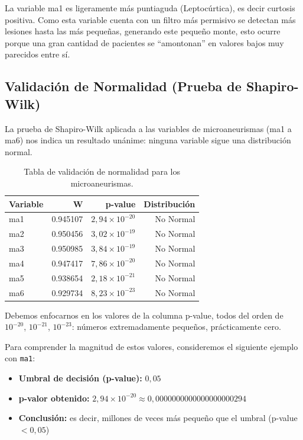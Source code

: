 La variable ma1 es ligeramente más puntiaguda (Leptocúrtica), es decir curtosis positiva. Como esta variable cuenta con un filtro más permisivo se detectan más lesiones hasta las más pequeñas, generando este pequeño monte, esto ocurre porque una gran cantidad de pacientes se \enquote{amontonan} en valores bajos muy parecidos entre sí.

\subsection{Validación de Normalidad (Prueba de Shapiro-Wilk)}

La prueba de Shapiro-Wilk aplicada a las variables de microaneurismas (ma1 a ma6) nos indica un resultado unánime: ninguna variable sigue una distribución normal.


\begin{table}[htbp]
\centering
\caption{Tabla de validación de normalidad para los microaneurismas.}
\begin{tabular}{lrrr}
\toprule
Variable & W & p-value & Distribución \\
\midrule
ma1 & 0.945107 & $2{,}94 \times 10^{-20}$ & No Normal \\
ma2 & 0.950456 & $3{,}02 \times 10^{-19}$ & No Normal \\
ma3 & 0.950985 & $3{,}84 \times 10^{-19}$ & No Normal \\
ma4 & 0.947417 & $7{,}86 \times 10^{-20}$ & No Normal \\
ma5 & 0.938654 & $2{,}18 \times 10^{-21}$ & No Normal \\
ma6 & 0.929734 & $8{,}23 \times 10^{-23}$ & No Normal \\
\bottomrule
\end{tabular}
\end{table}


Debemos enfocarnos en los valores de la columna p-value, todos del orden de $10^{-20}$, $10^{-21}$, $10^{-23}$: números extremadamente pequeños, prácticamente cero.

Para comprender la magnitud de estos valores, consideremos el siguiente ejemplo con \texttt{ma1}:

\begin{itemize}
    \item \textbf{Umbral de decisión (p-value):} $0{,}05$
    \item \textbf{p-valor obtenido:} $2{,}94 \times 10^{-20} \approx 0{,}0000000000000000000294$
    \item \textbf{Conclusión:} es decir, millones de veces más pequeño que el umbral (p-value $< 0{,}05$)
\end{itemize}

